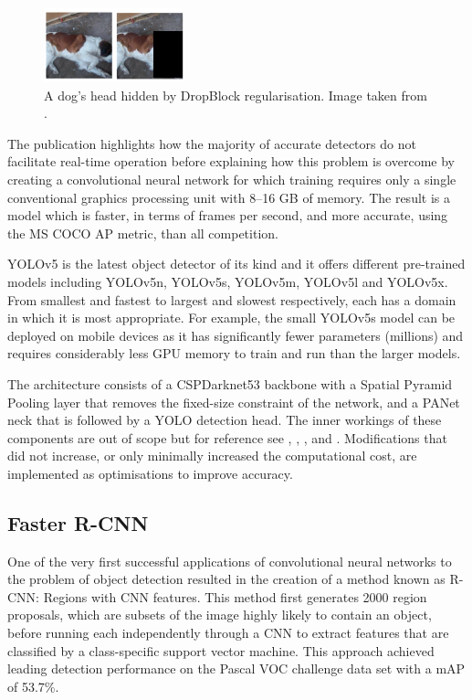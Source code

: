 \documentclass{thesis}
\begin{document}
\begin{figure}[h]
    \centering
    \includegraphics[scale=1]{images/dropblock.png}
    \caption{A dog's head hidden by DropBlock regularisation. Image taken from \cite{cutmix}.}
    \label{fig:dropblock}
\end{figure}


The publication highlights how the majority of accurate detectors do not facilitate real-time operation before explaining how this problem is overcome by creating a convolutional neural network for which training requires only a single conventional graphics processing unit with 8--16 GB of memory. The result is a model which is faster, in terms of frames per second, and more accurate, using the MS COCO AP metric, than all competition.

YOLOv5 is the latest object detector of its kind and it offers different pre-trained models including YOLOv5n, YOLOv5s, YOLOv5m, YOLOv5l and YOLOv5x. From smallest and fastest to largest and slowest respectively, each has a domain in which it is most appropriate. For example, the small YOLOv5s model can be deployed on mobile devices as it has significantly fewer parameters (millions) and requires considerably less GPU memory to train and run than the larger models\cite{yolov5}.

The architecture consists of a CSPDarknet53 backbone with a Spatial Pyramid Pooling layer that removes the fixed-size constraint of the network, and a PANet neck that is followed by a YOLO detection head\cite{yolov1}. The inner workings of these components are out of scope but for reference see \cite{yolov5}, \cite{cspnet}, \cite{spp}, and \cite{panet}. Modifications that did not increase, or only minimally increased the computational cost, are implemented as optimisations to improve accuracy\cite{yolov4}.

\subsection{Faster R-CNN}

One of the very first successful applications of convolutional neural networks to the problem of object detection resulted in the creation of a method known as R-CNN: Regions with CNN features\cite{rcnn}. This method first generates 2000 region proposals, which are subsets of the image highly likely to contain an object, before running each independently through a CNN to extract features that are classified by a class-specific support vector machine. This approach achieved leading detection performance on the Pascal VOC challenge data set with a mAP of 53.7\%.
\end{document}
